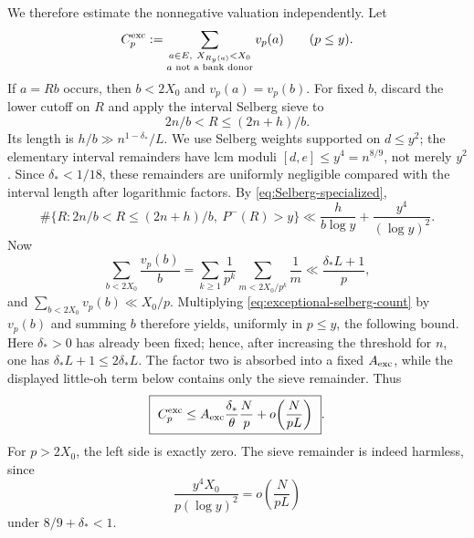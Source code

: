 \documentclass[11pt]{article}
\numberwithin{equation}{section}
\theoremstyle{definition}
\theoremstyle{remark}
\newcommand{\1}{\mathbf 1}
\begin{document}
We therefore estimate the nonnegative valuation independently.  Let
\[
 C_p^{\rm exc}:=
 \sum_{\substack{a\in E,\ X_{R_y(a)}<X_0\\
                  a\text{ not a bank donor}}}v_p(a)
 \qquad(p\le y).
\]
If \(a=Rb\) occurs, then \(b<2X_0\) and \(v_p(a)=v_p(b)\).  For fixed
\(b\), discard the lower cutoff on \(R\) and apply the interval Selberg
sieve to
\[
            2n/b<R\le(2n+h)/b.
\]
Its length is \(h/b\gg n^{1-\delta_*}/L\).  We use Selberg weights
supported on \(d\le y^2\); the elementary interval remainders have lcm
moduli
\(
 [d,e]\le y^4=n^{8/9}
\), not merely \(y^2\).  Since \(\delta_*<1/18\), these remainders are
uniformly negligible compared with the interval length after logarithmic
factors.  By \eqref{eq:Selberg-specialized},
\begin{equation}
 \#\{R:2n/b<R\le(2n+h)/b,\ P^-(R)>y\}
 \ll \frac{h}{b\log y}+\frac{y^4}{(\log y)^2}.
 \label{eq:exceptional-selberg-count}
\end{equation}
Now
\begin{equation}
 \sum_{b<2X_0}\frac{v_p(b)}b
 =\sum_{k\ge1}\frac1{p^k}
       \sum_{m<2X_0/p^k}\frac1m
 \ll\frac{\delta_*L+1}{p},
 \label{eq:exceptional-charge-harmonic}
\end{equation}
and \(\sum_{b<2X_0}v_p(b)\ll X_0/p\).  Multiplying
\eqref{eq:exceptional-selberg-count} by \(v_p(b)\) and summing \(b\)
therefore yields, uniformly in \(p\le y\), the following bound.  Here
\(\delta_*>0\) has already been fixed; hence, after increasing the
threshold for \(n\), one has \(\delta_*L+1\leq2\delta_*L\).  The factor
two is absorbed into a fixed \(A_{\rm exc}\), while the displayed
little-oh term below contains only the sieve remainder.  Thus
\begin{equation}
 \boxed{\ C_p^{\rm exc}
   \le A_{\rm exc}\frac{\delta_*}{\theta}\frac Np
       +o\!\left(\frac{N}{pL}\right)\ }.
 \label{eq:uniform-exceptional-charge}
\end{equation}
For \(p>2X_0\), the left side is exactly zero.  The sieve remainder is
indeed harmless, since
\[
 \frac{y^4X_0}{p(\log y)^2}
 =o\!\left(\frac{N}{pL}\right)
\]
under \(8/9+\delta_*<1\).
\end{document}
